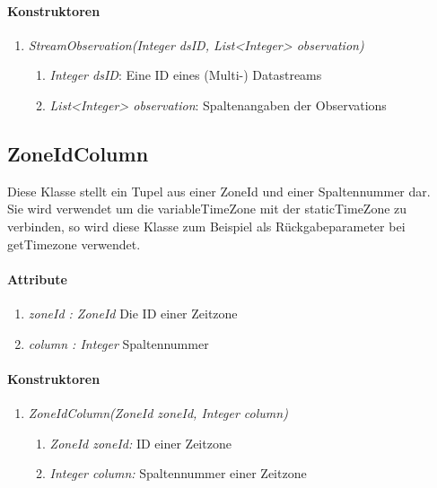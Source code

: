 \paragraph{Konstruktoren}
\begin{enumerate}[+]
	\item \textit{StreamObservation(Integer dsID, List<Integer> observation)} \\
	
	\begin{enumerate}[$\bullet$]
		\item \textit{Integer dsID}: Eine ID eines (Multi-) Datastreams
		\item \textit{List<Integer> observation}: Spaltenangaben der Observations 
	\end{enumerate}
\end{enumerate}






\subsection*{ZoneIdColumn}\label{zoneCol}
Diese Klasse stellt ein Tupel aus einer ZoneId und einer Spaltennummer dar.\\
Sie wird verwendet um die variableTimeZone mit der staticTimeZone zu verbinden, so wird diese Klasse zum Beispiel als Rückgabeparameter bei getTimezone verwendet.

\paragraph{Attribute}
\begin{enumerate}[-]
	\item \textit{zoneId : ZoneId} Die ID einer Zeitzone
	\item \textit{column : Integer} Spaltennummer
\end{enumerate}

\paragraph{Konstruktoren}
\begin{enumerate}[+]
	\item \textit{ZoneIdColumn(ZoneId zoneId, Integer column)} \\
	
	\begin{enumerate}[$\bullet$]
		\item \textit{ZoneId zoneId:} ID einer Zeitzone
		\item \textit{Integer column:} Spaltennummer einer Zeitzone
	\end{enumerate}
\end{enumerate}












